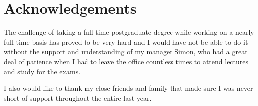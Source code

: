 

\begingroup

\let\clearpage\relax
\let\cleardoublepage\relax
\let\cleardoublepage\relax

\chapter*{Acknowledgements} %

The challenge of taking a full-time postgraduate degree while working on a nearly full-time basis has proved to be very hard and I would have not be able to do it without the support and understanding of my manager Simon, who had a great deal of patience when I had to leave the office countless times to attend lectures and study for the exams.

I also would like to thank my close friends and family that made sure I was never short of support throughout the entire last year.

\endgroup